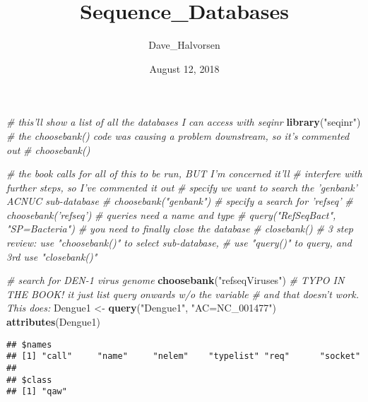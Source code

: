 \documentclass[]{article}
\title{Sequence\_Databases}
\author{Dave\_Halvorsen}
\date{August 12, 2018}
\newenvironment{Shaded}{\begin{snugshade}}{\end{snugshade}}
\newcommand{\KeywordTok}[1]{\textcolor[rgb]{0.13,0.29,0.53}{\textbf{#1}}}
\newcommand{\StringTok}[1]{\textcolor[rgb]{0.31,0.60,0.02}{#1}}
\newcommand{\CommentTok}[1]{\textcolor[rgb]{0.56,0.35,0.01}{\textit{#1}}}
\newcommand{\NormalTok}[1]{#1}
\begin{document}
\maketitle

\begin{Shaded}
\begin{Highlighting}[]
\CommentTok{# this'll show a list of all the databases I can access with seqinr}
\KeywordTok{library}\NormalTok{(}\StringTok{"seqinr"}\NormalTok{)}
\CommentTok{# the choosebank() code was causing a problem downstream, so it's commented out}
\CommentTok{# choosebank()}
\end{Highlighting}
\end{Shaded}

\begin{Shaded}
\begin{Highlighting}[]
\CommentTok{# the book calls for all of this to be run, BUT I'm concerned it'll}
\CommentTok{# interfere with further steps, so I've commented it out}
\CommentTok{# specify we want to search the 'genbank' ACNUC sub-database}
\CommentTok{# choosebank("genbank")}
\CommentTok{# specify a search for 'refseq'}
\CommentTok{# choosebank('refseq') }
\CommentTok{# queries need a name and type}
\CommentTok{# query("RefSeqBact", "SP=Bacteria")}
\CommentTok{# you need to finally close the database}
\CommentTok{# closebank()}
\CommentTok{# 3 step review: use "choosebank()" to select sub-database, }
\CommentTok{# use "query()" to query, and 3rd use "closebank()"}
\end{Highlighting}
\end{Shaded}

\begin{Shaded}
\begin{Highlighting}[]
\CommentTok{# search for DEN-1 virus genome}
\KeywordTok{choosebank}\NormalTok{(}\StringTok{"refseqViruses"}\NormalTok{)}
\CommentTok{# TYPO IN THE BOOK! it just list query onwards w/o the variable }
\CommentTok{# and that doesn't work. This does:}
\NormalTok{Dengue1 <-}\StringTok{ }\KeywordTok{query}\NormalTok{(}\StringTok{"Dengue1"}\NormalTok{, }\StringTok{"AC=NC_001477"}\NormalTok{)}
\KeywordTok{attributes}\NormalTok{(Dengue1)}
\end{Highlighting}
\end{Shaded}

\begin{verbatim}
## $names
## [1] "call"     "name"     "nelem"    "typelist" "req"      "socket"  
## 
## $class
## [1] "qaw"
\end{verbatim}
\end{document}
